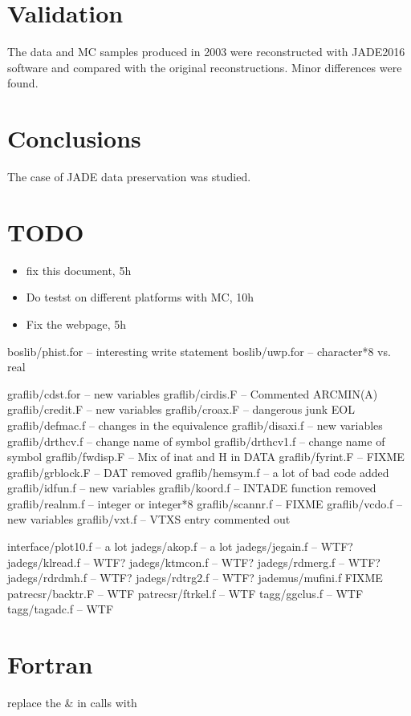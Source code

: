 \section{Validation}
The data and MC samples produced in 2003 were reconstructed with JADE2016 software and compared with the 
original reconstructions. Minor differences were found.


\section{Conclusions}
The case of JADE data preservation was studied.

\section*{TODO}
\begin{itemize}
\item fix this document, 5h
\item Do testst on different platforms with MC, 10h
\item Fix the webpage, 5h
\end{itemize}

boslib/phist.for -- interesting write statement
boslib/uwp.for -- character*8 vs. real

graflib/cdst.for -- new variables
graflib/cirdis.F -- Commented ARCMIN(A)
graflib/credit.F -- new variables
graflib/croax.F -- dangerous junk EOL
graflib/defmac.f -- changes in the equivalence
graflib/disaxi.f -- new variables
graflib/drthcv.f -- change name of symbol
graflib/drthcv1.f -- change name of symbol
graflib/fwdisp.F -- Mix of inat and H in DATA
graflib/fyrint.F -- FIXME
graflib/grblock.F -- DAT removed
graflib/hemsym.f -- a lot of bad code added
graflib/idfun.f -- new variables
graflib/koord.f -- INTADE function removed
graflib/realnm.f -- integer or integer*8
graflib/scannr.f -- FIXME
graflib/vcdo.f -- new variables
graflib/vxt.f -- VTXS entry commented out

interface/plot10.f -- a lot
jadegs/akop.f -- a lot
jadegs/jegain.f -- WTF?
jadegs/klread.f -- WTF?
jadegs/ktmcon.f -- WTF?
jadegs/rdmerg.f -- WTF?
jadegs/rdrdmh.f -- WTF?
jadegs/rdtrg2.f -- WTF?
jademus/mufini.f  FIXME
patrecsr/backtr.F -- WTF
patrecsr/ftrkel.f -- WTF
tagg/ggclus.f -- WTF
tagg/tagadc.f -- WTF

\section{Fortran}
\begin{itemize}
replace the  \& in calls with \*

\end{itemize}




